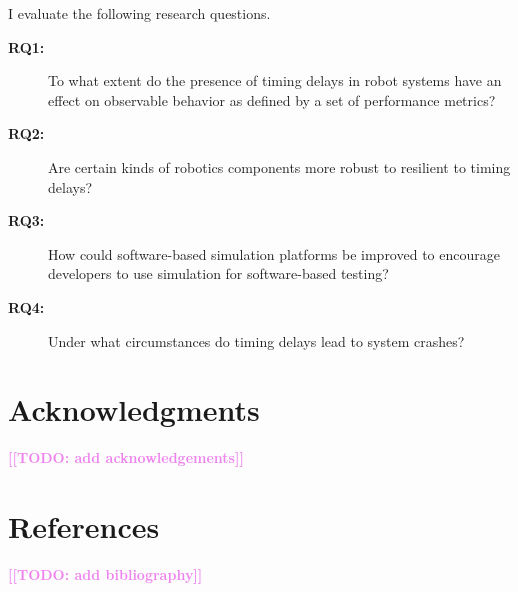 \documentclass[conference]{IEEEtran}
\newcommand{\todo}[1]{\textcolor{violet}{{\bfseries [[TODO: #1]]}}}
\begin{document}
I evaluate the following research questions.
\begin{description}
\item[\textbf{RQ1:}] To what extent do the presence of timing delays in robot systems have an effect on observable behavior as defined by a set of performance metrics?
\item[\textbf{RQ2:}] Are certain kinds of robotics components more robust to resilient to timing delays?
\item[\textbf{RQ3:}] How could software-based simulation platforms be improved
  to encourage developers to use simulation for software-based testing?
\item[\textbf{RQ4:}] Under what circumstances do timing delays lead to system crashes?
\end{description}

\section*{Acknowledgments}

\todo{add acknowledgements}

\section*{References}
\todo{add bibliography}
\end{document}
